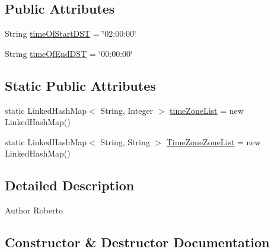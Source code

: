 \subsection*{Public Attributes}
\begin{DoxyCompactItemize}
\item 
String \hyperlink{classcom_1_1eneri_1_1scorpio__metertool_1_1ui_1_1_horary_a51fd1aa652af531b30287e0a26f355c0}{time\+Of\+Start\+D\+ST} = \char`\"{}02\+:00\+:00\char`\"{}
\item 
String \hyperlink{classcom_1_1eneri_1_1scorpio__metertool_1_1ui_1_1_horary_aafc22a82e7c01787e43794a896a881c6}{time\+Of\+End\+D\+ST} = \char`\"{}00\+:00\+:00\char`\"{}
\end{DoxyCompactItemize}
\subsection*{Static Public Attributes}
\begin{DoxyCompactItemize}
\item 
static Linked\+Hash\+Map$<$ String, Integer $>$ \hyperlink{classcom_1_1eneri_1_1scorpio__metertool_1_1ui_1_1_horary_ae4285b4d6e3d55f8e0a59e724913cbb6}{time\+Zone\+List} = new Linked\+Hash\+Map()
\item 
static Linked\+Hash\+Map$<$ String, String $>$ \hyperlink{classcom_1_1eneri_1_1scorpio__metertool_1_1ui_1_1_horary_a148459d1e4169eba018f0a58a3c89bd0}{Time\+Zone\+Zone\+List} = new Linked\+Hash\+Map()
\end{DoxyCompactItemize}


\subsection{Detailed Description}
\begin{DoxyAuthor}{Author}
Roberto 
\end{DoxyAuthor}


\subsection{Constructor \& Destructor Documentation}
\mbox{\label{classcom_1_1eneri_1_1scorpio__metertool_1_1ui_1_1_horary_a7a3d2ae465ad0040054edf0d102a5712}} 
